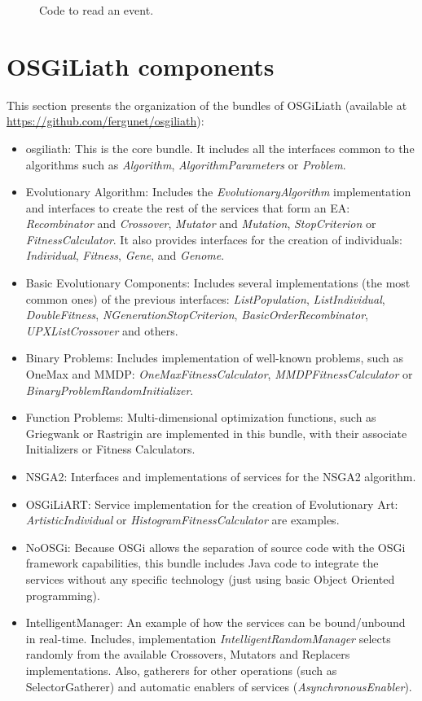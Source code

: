 \begin{figure}
\usebox{\mintedboxOSGIreadevent}
\caption{Code to read an event.}
\label{fig:OSGIreadevent} 
\end{figure}

\section{OSGiLiath components}

This section presents the organization of the bundles of OSGiLiath (available at \url{https://github.com/fergunet/osgiliath}):

\begin{itemize}
\item osgiliath: This is the core bundle. It includes all the interfaces common to the algorithms such as {\em Algorithm}, {\em AlgorithmParameters} or {\em Problem}. 
\item Evolutionary Algorithm:  Includes the {\em EvolutionaryAlgorithm} implementation and interfaces to create the rest of the services that form an EA: {\em Recombinator} and {\em Crossover}, {\em Mutator} and {\em Mutation}, {\em StopCriterion} or {\em FitnessCalculator}. It also provides interfaces for the creation of individuals: {\em Individual}, {\em Fitness}, {\em Gene}, and {\em Genome}. 
\item Basic Evolutionary Components: Includes several implementations (the most common ones) of the previous interfaces: {\em ListPopulation}, {\em ListIndividual}, {\em DoubleFitness}, {\em NGenerationStopCriterion}, {\em BasicOrderRecombinator}, {\em UPXListCrossover} and others.
\item Binary Problems: Includes implementation of well-known problems, such as OneMax and MMDP: {\em OneMaxFitnessCalculator}, {\em MMDPFitnessCalculator} or {\em BinaryProblemRandomInitializer}.
\item Function Problems: Multi-dimensional optimization functions, such as Griegwank or Rastrigin are implemented in this bundle, with their associate Initializers or Fitness Calculators.
\item NSGA2: Interfaces and implementations of services for the NSGA2 algorithm.
\item OSGiLiART: Service implementation for the creation of Evolutionary Art: {\em ArtisticIndividual} or {\em HistogramFitnessCalculator} are examples.
\item NoOSGi: Because OSGi allows the separation of source code with the OSGi framework capabilities, this bundle includes Java code to integrate the services without any specific technology (just using basic Object Oriented programming).
\item IntelligentManager: An example of how the services can be bound/unbound in real-time. Includes, implementation {\em IntelligentRandomManager} selects randomly from the available Crossovers, Mutators and Replacers implementations. Also, gatherers for other operations (such as SelectorGatherer) and automatic enablers of services ({\em AsynchronousEnabler}).
\end{itemize}